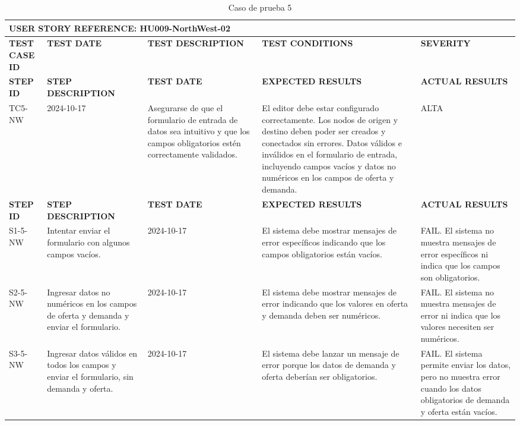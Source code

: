 \documentclass[stu, 12pt, letterpaper, donotrepeattitle, floatsintext, natbib]{apa7}
\begin{document}
\begin{longtable}{|p{2cm}|p{3cm}|p{3cm}|p{3cm}|p{3cm}|}
    \caption{Caso de prueba 5} \label{tab:casos_prueba5} \\
    \hline
        \multicolumn{5}{|l|}{\textbf{USER STORY REFERENCE: HU009-NorthWest-02}} \\ \hline

    \textbf{TEST CASE ID} & \textbf{TEST DATE} & \textbf{TEST DESCRIPTION} & \textbf{TEST CONDITIONS} & \textbf{SEVERITY} \\ \hline
    \endfirsthead
    \hline
    \textbf{STEP ID} & \textbf{STEP DESCRIPTION} & \textbf{TEST DATE} & \textbf{EXPECTED RESULTS} & \textbf{ACTUAL RESULTS} \\ \hline
    \endhead
    TC5-NW & 2024-10-17 & Asegurarse de que el formulario de entrada de datos sea intuitivo y que los campos obligatorios estén correctamente validados. & El editor debe estar configurado correctamente. Los nodos de origen y destino deben poder ser creados y conectados sin errores. Datos válidos e inválidos en el formulario de entrada, incluyendo campos vacíos y datos no numéricos en los campos de oferta y demanda. & ALTA \\ \hline
    \textbf{STEP ID} & \textbf{STEP DESCRIPTION} & \textbf{TEST DATE} & \textbf{EXPECTED RESULTS} & \textbf{ACTUAL RESULTS} \\ \hline
    S1-5-NW & Intentar enviar el formulario con algunos campos vacíos. & 2024-10-17 & El sistema debe mostrar mensajes de error específicos indicando que los campos obligatorios están vacíos. & FAIL. El sistema no muestra mensajes de error específicos ni indica que los campos son obligatorios. \\ \hline
    S2-5-NW & Ingresar datos no numéricos en los campos de oferta y demanda y enviar el formulario. & 2024-10-17 & El sistema debe mostrar mensajes de error indicando que los valores en oferta y demanda deben ser numéricos. & FAIL. El sistema no muestra mensajes de error ni indica que los valores necesiten ser numéricos. \\ \hline
    S3-5-NW & Ingresar datos válidos en todos los campos y enviar el formulario, sin demanda y oferta. & 2024-10-17 & El sistema debe lanzar un mensaje de error porque los datos de demanda y oferta deberían ser obligatorios. & FAIL. El sistema permite enviar los datos, pero no muestra error cuando los datos obligatorios de demanda y oferta están vacíos. \\ \hline
\end{longtable}
\end{document}
